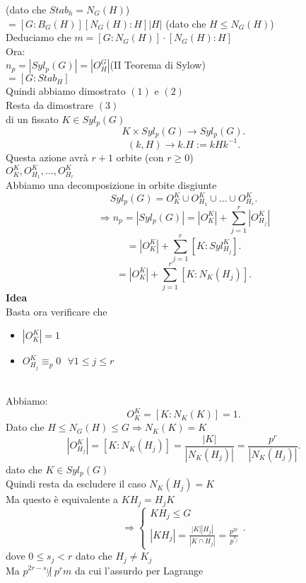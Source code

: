 \documentclass[12px]{article}
\begin{document}
\begin{dimo}
\begin{dimo}
		 (dato che $Stab_h = N_G(H)$)\\
		 $=[G:B_G(H)][N_G(H):H]|H|$\hfill
		 (dato che $H\leq N_G(H)$) \\
		 Deduciamo che $m = [G:N_G(H)]\cdot[N_G(H):H]$\\
		 Ora:\\
	 $n_p = |Syl_p(G)| = |O_H^G|$\hfill (II Teorema di Sylow)\\
	 $ = [G:Stab_H]$\\
	 Quindi abbiamo dimostrato $(1)$ e $(2)$\\
	 Resta da dimostrare $(3)$\\
	 di un fissato  $K\in Syl_p(G)$\\
	 \[
		 K\times Syl_p(G) \rightarrow Syl_p (G)
	 .\] 
	 \[
		 (k,H) \rightarrow k.H := kHk^{-1}
	 .\] 
	 Questa azione avrà $r + 1$ orbite (con $r \geq 0$)\\
	 $O_K^K, O_{H_1}^K,\ldots,O_{H_r}^K$\\
	 Abbiamo una decomposizione in orbite disgiunte
	 \[
		 Syl_p(G) = O_K^K\cup O_{H_1}^K\cup\ldots\cup O_{H_r}^K
	 .\] 
	 \[ \Rightarrow n_p = |Syl_p (G)| = |O_K^K| + \sum^r_{j=1}|O_{H_j}^K|\]
	 \[
		 =|O_K^K| + \sum^r_{j=1}[K:Syl_{H_j}^K]
	 .\] 
	 \[
		 = |O_K^K| + \sum^r_{j=1}[K:N_K(H_j)]
	 .\]
	 \textbf{Idea}\\
	 Basta ora verificare che
	 \begin{itemize}
		 \item $|O_K^K| = 1$
		 \item  $O_{H_j}^K\equiv_p 0 \ \ \ \forall 1\leq j\leq r$
	 \end{itemize}\\
	 Abbiamo:\\
	  \[
		  O_K^K = [K:N_K(K)] = 1
	 .\] 
	 Dato che $H\leq N_G(H)\leq G \Rightarrow N_K(K) = K$ 
	 \[
		 |O_{H_j}^K| = [K:N_K(H_j)] = \frac {|K|}{|N_K(H_{j})|} = \frac {p^r}{|N_K(H_j)|}
	 .\] 
	 dato che $K \in Syl_p(G)$\\
	 Quindi resta da escludere il caso  $N_K(H_j) = K$\\
	 Ma questo è equivalente a  $KH_j = H_j K$ 
	 \[
	 \Rightarrow \begin{cases}
	 	KH_j\leq G\\
		|KH_j| = \frac { |K||H_j|}{|K\cap H_j|} = \frac{p^{2r}}{p^{s_j}}
	 \end{cases}
	 .\] 
	 dove $0\leq s_j < r$ dato che  $H_j\neq K_j$\\
	 Ma  $p^{2r-s_j}\not | \ p^rm$ da cui l'assurdo per Lagrange
	\end{dimo}

\end{dimo}
\end{document}
